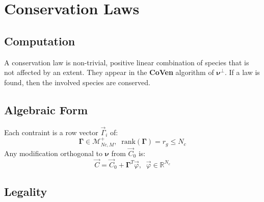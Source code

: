 \documentclass[aps,12pt]{revtex4}
\begin{document}
\section{Conservation Laws}

\subsection{Computation}
A conservation law is non-trivial, positive linear combination of species that is not affected by an extent.
They appear in the {\bf CoVen} algorithm of $\bm{\nu}^\perp$. If a law is found, then the involved species are conserved.
 
\subsection{Algebraic Form}
Each contraint is a row vector $\vec \Gamma_i$ of:
\begin{equation}
\bm{\Gamma} \in \mathcal{M}^+_{Nc,M},\;\;\mathrm{rank}(\bm \Gamma) = r_g \leq N_c
\end{equation}
Any modification orthogonal to $\bm \nu$ from $\vec C_0$ is:
\begin{equation}
\label{eq:gamma}
\vec{C} = \vec C_0 + \bm{\Gamma}^T \vec\varphi,\;\; \vec \varphi \in \mathbb{R}^{N_c}
\end{equation}

\subsection{Legality}
\end{document}
